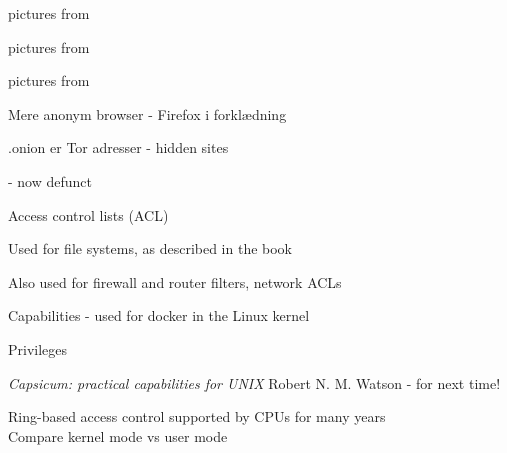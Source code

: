 \documentclass[Screen16to9,17pt]{foils}
\begin{document}
\centerline{pictures from }



\centerline{pictures from }



\centerline{pictures from }







\centerline{\color{titlecolor} Mere anonym browser - Firefox i forklædning}




\centerline{\color{titlecolor} .onion er Tor adresser - hidden sites}

 - now defunct



\begin{list1}
\item Access control lists (ACL)
\item Used for file systems, as described in the book
\item Also used for firewall and router filters, network ACLs
\item Capabilities - used for docker in the Linux kernel
\item Privileges
\item \emph{Capsicum: practical capabilities for UNIX} Robert N. M. Watson - for next time!
\item Ring-based access control supported by CPUs for many years\\
Compare kernel mode vs user mode
\end{list1}
\end{document}
